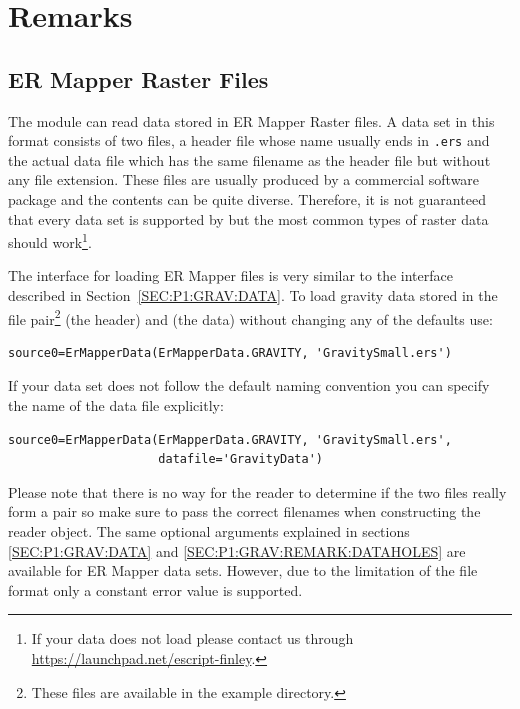 \section{Remarks}

\subsection{ER Mapper Raster Files}\label{SEC:P1:GRAV:REMARK:ERMAPPER}
The \downunder module can read data stored in ER Mapper Raster files. A data
set in this format consists of two files, a header file whose name usually ends
in \verb|.ers| and the actual data file which has the same filename as the
header file but without any file extension.
These files are usually produced by a commercial software package and the
contents can be quite diverse.
Therefore, it is not guaranteed that every data set is supported by \downunder
but the most common types of raster data should work\footnote{If your data
does not load please contact us through \url{https://launchpad.net/escript-finley}.}.

The interface for loading ER Mapper files is very similar to the \netcdf
interface described in Section~\ref{SEC:P1:GRAV:DATA}.
To load gravity data stored in the file pair\footnote{These files are available
in the example directory.}  (the
header) and  (the data) without changing any of the
defaults use:
\begin{verbatim}
source0=ErMapperData(ErMapperData.GRAVITY, 'GravitySmall.ers')
\end{verbatim}
If your data set does not follow the default naming convention you can specify
the name of the data file explicitly:
\begin{verbatim}
source0=ErMapperData(ErMapperData.GRAVITY, 'GravitySmall.ers',
                     datafile='GravityData')
\end{verbatim}
Please note that there is no way for the reader to determine if the two files
really form a pair so make sure to pass the correct filenames when constructing
the reader object.
The same optional arguments explained in sections \ref{SEC:P1:GRAV:DATA} and
\ref{SEC:P1:GRAV:REMARK:DATAHOLES} are available for ER Mapper data sets.
However, due to the limitation of the file format only a constant error value
is supported.

